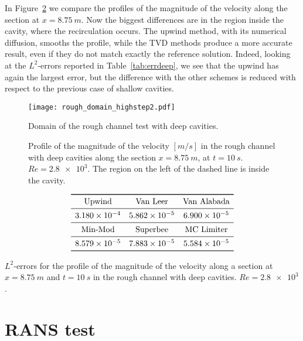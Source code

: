 In Figure~\ref{fig:linecompdeep} we compare the profiles of the magnitude of 
the velocity along the section at $x=\SI{8.75}{m}$. Now the biggest differences 
are in the region inside the cavity, where the recirculation occurs. The upwind 
method, with its numerical diffusion, smooths the profile, while the TVD 
methods produce a more accurate result, even if they do not match exactly the 
reference solution. Indeed, looking at the $L^2$-errors reported in 
Table~\ref{tab:errdeep}, we see that the upwind has again the largest error, 
but the difference with the other schemes is reduced with respect to the 
previous case of shallow cavities.
\begin{figure}
	\centering
	\texttt{[image: rough\_domain\_highstep2.pdf]}
	\caption[Domain of the rough channel test with deep cavities]{Domain of the 
	rough channel test with deep cavities.}
	\label{fig:roughdomdeep}
\end{figure}
\begin{figure}
	\centering
	
	\caption[Profile of the magnitude of the velocity in the rough channel with 
	deep cavities at $Re=\num{2.8e3}$]{Profile of the magnitude of the velocity 
		$[\si{m/s}]$ in the rough channel with deep cavities along the section 
		$x=\SI{8.75}{m}$, at $t=\SI{10}{s}$. $Re=\num{2.8e3}$. The region on 
		the 
		left of the dashed line is inside the cavity.}
	\label{fig:linecompdeep}
\end{figure}
\begin{table}
	\centering
	\[
	\begin{array}{ccc}
	\toprule
	\text{Upwind} & \text{Van Leer} & \text{Van Alabada}\\
	\midrule
	\num{3.180e-4} & \num{5.862e-5} & \num{6.900e-5}\\
	\midrule
	\text{Min-Mod} & \text{Superbee} & \text{MC Limiter} \\
	\midrule
	\num{8.579e-5} & \num{7.883e-5} & \num{5.584e-5}\\
	\bottomrule
	\end{array}
	\]
	\caption[$L^2$-errors for the profile of the magnitude of the velocity in 
	the rough channel with deep cavities]{$L^2$-errors for the profile of the 
	magnitude of the velocity along a section at $x=\SI{8.75}{m}$ and 
	$t=\SI{10}{s}$ in the rough channel with deep cavities. $Re = \num{2.8e3}$.}
	\label{tab:errdeep}
\end{table}
%
\section{RANS test}
